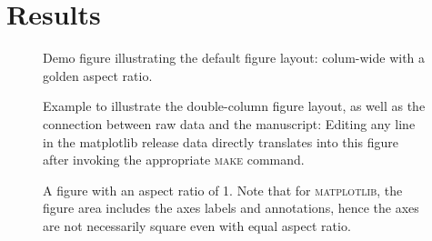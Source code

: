 
\section{Results}%
\label{sec:results}%
\lipsum[3-5]

\begin{figure}[t]
  
  \caption{Demo figure illustrating the default figure layout: colum-wide with a golden aspect ratio.}
  \label{fig:hlines_demo}
\end{figure}
\lipsum[3-8]

\begin{figure*}[t]
  
  \caption{Example to illustrate the double-column figure layout, as well as the connection between raw data and the manuscript: Editing any line in the matplotlib release data directly translates into this figure after invoking the appropriate \textsc{make} command.}
  \label{fig:matplotlib_release_dates}
\end{figure*}

\lipsum[1-10]

\begin{figure}[t]
  
  \caption{A figure with an aspect ratio of 1. Note that for \textsc{matplotlib}, the figure area includes the axes labels and annotations, hence the axes are not necessarily square even with equal aspect ratio.}
  \label{fig:solution_space}
\end{figure}

